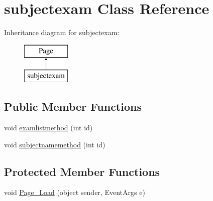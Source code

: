 \hypertarget{classsubjectexam}{}\section{subjectexam Class Reference}
\label{classsubjectexam}
Inheritance diagram for subjectexam\+:\begin{figure}[H]
\begin{center}
\leavevmode
\includegraphics[height=2.000000cm]{classsubjectexam}
\end{center}
\end{figure}
\subsection*{Public Member Functions}
\begin{DoxyCompactItemize}
\item 
void \mbox{\hyperlink{classsubjectexam_ac0fe9d455ce59cdeeacdf71544f1786f}{examlistmethod}} (int id)
\item 
void \mbox{\hyperlink{classsubjectexam_a702c75b4ff95fdf12d5b11ad0cfaf62b}{subjectnamemethod}} (int id)
\end{DoxyCompactItemize}
\subsection*{Protected Member Functions}
\begin{DoxyCompactItemize}
\item 
void \mbox{\hyperlink{classsubjectexam_aad45233acf953fa73d517c5afe62903f}{Page\+\_\+\+Load}} (object sender, Event\+Args e)
\end{DoxyCompactItemize}
